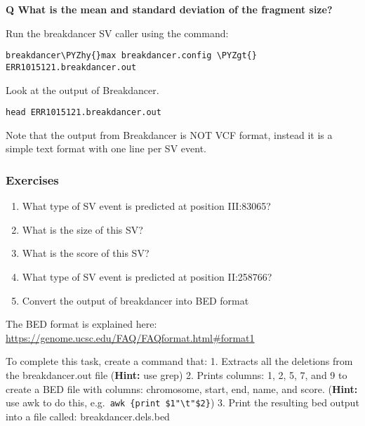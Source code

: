 \documentclass[11pt]{article}
\makeatletter
\def\PYZgt{\char`\>}
\def\PYZhy{\char`\-}
\newcommand{\boxspacing}{\kern\kvtcb@left@rule\kern\kvtcb@boxsep}
\newcommand{\prompt}[4]{
        {\ttfamily\llap{{\color{blue}\LARGE\faKeyboardO\hspace{3pt}#4}}\vspace{-\baselineskip}}
    }
\makeatother
\begin{document}
    \textbf{Q What is the mean and standard deviation of the fragment size?}

Run the breakdancer SV caller using the command:

    \begin{tcolorbox}[breakable, size=fbox, boxrule=1pt, pad at break*=1mm,colback=cellbackground, colframe=cellborder]
\prompt{In}{incolor}{ }{\boxspacing}
\begin{Verbatim}[commandchars=\\\{\}]
breakdancer\PYZhy{}max breakdancer.config \PYZgt{} ERR1015121.breakdancer.out
\end{Verbatim}
\end{tcolorbox}

    Look at the output of Breakdancer.

    \begin{tcolorbox}[breakable, size=fbox, boxrule=1pt, pad at break*=1mm,colback=cellbackground, colframe=cellborder]
\prompt{In}{incolor}{ }{\boxspacing}
\begin{Verbatim}[commandchars=\\\{\}]
head ERR1015121.breakdancer.out
\end{Verbatim}
\end{tcolorbox}

    Note that the output from Breakdancer is NOT VCF format, instead it is a
simple text format with one line per SV event.

\hypertarget{exercises}{%
\subsubsection{Exercises}\label{exercises}}

\begin{enumerate}
\def\labelenumi{\arabic{enumi}.}
\item
  What type of SV event is predicted at position III:83065?
\item
  What is the size of this SV?
\item
  What is the score of this SV?
\item
  What type of SV event is predicted at position II:258766?
\item
  Convert the output of breakdancer into BED format
\end{enumerate}

    The BED format is explained here:
\url{https://genome.ucsc.edu/FAQ/FAQformat.html\#format1}

To complete this task, create a command that: 1. Extracts all the
deletions from the breakdancer.out file (\textbf{Hint:} use grep) 2.
Prints columns: 1, 2, 5, 7, and 9 to create a BED file with columns:
chromosome, start, end, name, and score. (\textbf{Hint:} use awk to do
this,
e.g.~\texttt{awk\ \textquotesingle{}\{print\ \$1"\textbackslash{}t"\$2\}\textquotesingle{}})
3. Print the resulting bed output into a file called:
breakdancer.dels.bed
\end{document}
